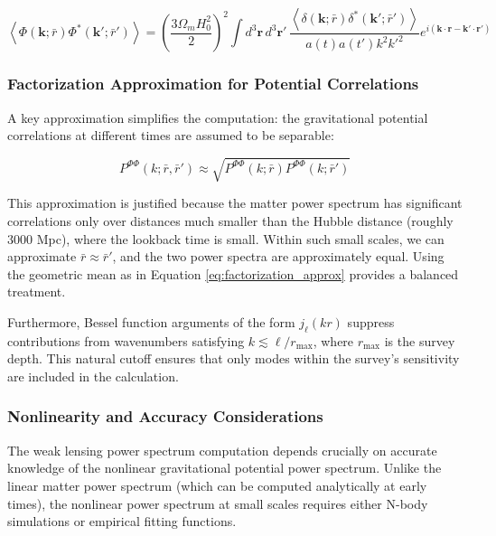 \begin{equation}
\left\langle \Phi(\mathbf{k}; \bar{r}) \Phi^*(\mathbf{k}'; \bar{r}') \right\rangle = \left(\frac{3\Omega_m H_0^2}{2}\right)^2 \int d^3\mathbf{r} \, d^3\mathbf{r}' \, \frac{\left\langle \delta(\mathbf{k}; \bar{r}) \delta^*(\mathbf{k}'; \bar{r}') \right\rangle}{a(t)a(t') k^2 k'^2} e^{i(\mathbf{k} \cdot \mathbf{r} - \mathbf{k}' \cdot \mathbf{r}')}
\label{eq:potential_corr_integral}
\end{equation}

\subsubsection{Factorization Approximation for Potential Correlations}

A key approximation simplifies the computation: the gravitational potential correlations at different times are assumed to be separable:

\begin{equation}
P^{\Phi\Phi}(k; \bar{r}, \bar{r}') \approx \sqrt{P^{\Phi\Phi}(k; \bar{r}) P^{\Phi\Phi}(k; \bar{r}')}
\label{eq:factorization_approx}
\end{equation}

This approximation is justified because the matter power spectrum has significant correlations only over distances much smaller than the Hubble distance (roughly 3000 Mpc), where the lookback time is small. Within such small scales, we can approximate $\bar{r} \approx \bar{r}'$, and the two power spectra are approximately equal. Using the geometric mean as in Equation \ref{eq:factorization_approx} provides a balanced treatment.

Furthermore, Bessel function arguments of the form $j_\ell(kr)$ suppress contributions from wavenumbers satisfying $k \lesssim \ell/r_{\max}$, where $r_{\max}$ is the survey depth. This natural cutoff ensures that only modes within the survey's sensitivity are included in the calculation.

\subsubsection{Nonlinearity and Accuracy Considerations}

The weak lensing power spectrum computation depends crucially on accurate knowledge of the nonlinear gravitational potential power spectrum. Unlike the linear matter power spectrum (which can be computed analytically at early times), the nonlinear power spectrum at small scales requires either N-body simulations or empirical fitting functions.

